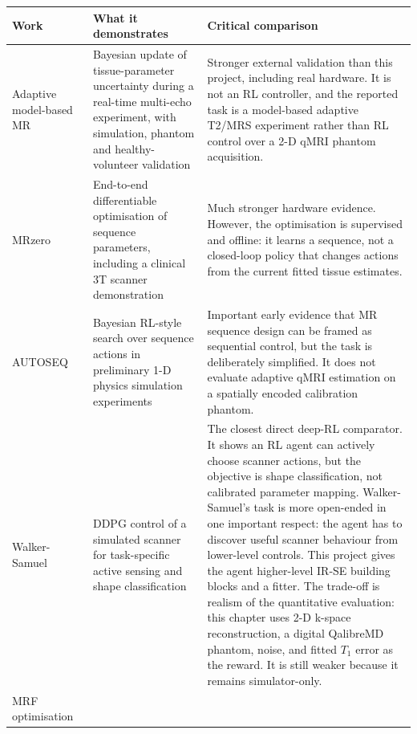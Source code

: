 \begin{table}[!htbp]
\centering
\scriptsize
\setlength{\tabcolsep}{4pt}
\renewcommand{\arraystretch}{0.96}
\begin{tabularx}{\linewidth}{>{\raggedright\arraybackslash}p{2.7cm}
>{\raggedright\arraybackslash}p{4.2cm}
>{\raggedright\arraybackslash}X}
\toprule
Work & What it demonstrates & Critical comparison \\
\midrule
Adaptive model-based MR~\cite{adaptive_mri:23} &
Bayesian update of tissue-parameter uncertainty during a real-time multi-echo
experiment, with simulation, phantom and healthy-volunteer validation &
Stronger external validation than this project, including real hardware. It is
not an RL controller, and the reported task is a model-based adaptive T2/MRS
experiment rather than RL control over a 2-D qMRI phantom acquisition. \\
\addlinespace
MRzero~\cite{MRISeqSupLearning:21} &
End-to-end differentiable optimisation of sequence parameters, including a
clinical 3T scanner demonstration &
Much stronger hardware evidence. However, the optimisation is supervised and
offline: it learns a sequence, not a closed-loop policy that changes actions from
the current fitted tissue estimates. \\
\addlinespace
AUTOSEQ~\cite{zhu2018autoseq} &
Bayesian RL-style search over sequence actions in preliminary 1-D physics
simulation experiments &
Important early evidence that MR sequence design can be framed as sequential
control, but the task is deliberately simplified. It does not evaluate adaptive
qMRI estimation on a spatially encoded calibration phantom. \\
\addlinespace
Walker-Samuel~\cite{Walk_RL_CONTROL_MRI:19} &
DDPG control of a simulated scanner for task-specific active sensing and
shape classification &
The closest direct deep-RL comparator. It shows an RL agent can actively choose
scanner actions, but the objective is shape classification, not calibrated
parameter mapping. Walker-Samuel's task is more open-ended in one important
respect: the agent has to discover useful scanner behaviour from lower-level
controls. This project gives the agent higher-level IR-SE building blocks and a
fitter. The trade-off is realism of the quantitative evaluation: this chapter
uses 2-D k-space reconstruction, a digital QalibreMD phantom, noise, and fitted
$T_1$ error as the reward. It is still weaker because it remains simulator-only. \\
\addlinespace
MRF optimisation~\cite{Jordan_MRF_AUTO:21,mehta_mrf_review:2019} &

\end{tabularx}
\end{table}
